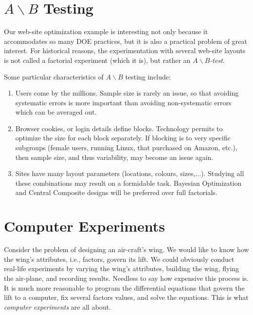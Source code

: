 \section[AB testing]{$A\backslash B$ Testing}
Our web-site optimization example is interesting not only because it accommodates so many DOE practices, but it is also a practical problem of great interest.
For historical reasons, the experimentation with several web-site layouts is not called a factorial experiment (which it is), but rather an \emph{$A\backslash B$-test}.

Some particular characteristics of $A\backslash B$ testing include:
\begin{enumerate}
\item Users come by the millions. Sample size is rarely an issue, so that avoiding systematic errors is more important than avoiding non-systematic errors which can be averaged out.
\item Browser cookies, or login details define blocks. Technology permits to optimize the size for each block separately. If blocking is to very specific subgroups (female users, running Linux, that purchased on Amazon, etc.), then sample size, and thus variability, may become an issue again.
\item Sites have many layout parameters (locations, colours, sizes,...). Studying all these combinations may result on a formidable task. Bayesian Optimization and Central Composite designs will be preferred over full factorials. 
\end{enumerate}




\section{Computer Experiments}
\begin{example}
\label{eg:wings}
Consider the problem of designing an air-craft's wing.
We would like to know how the wing's attributes, i.e., factors, govern its lift.
We could obviously conduct real-life experiments by varying the wing's attributes, building the wing, flying the air-plane, and recording results. 
Needless to say how expensive this process is.
It is much more reasonable to program the differential equations that govern the lift to a computer, fix several factors values, and solve the equations.
This is what \emph{computer experiments} are all about. 
\end{example}


